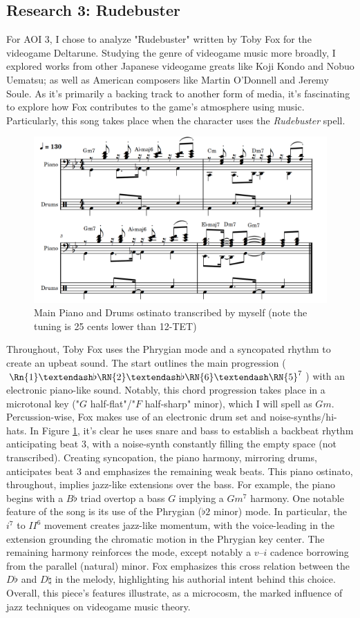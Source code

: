 \documentclass[12pt]{article}
\begin{document}
\subsection{Research 3: Rudebuster}

For AOI 3, I chose to analyze "Rudebuster"\autocite{rudebuster} written by Toby Fox for the videogame Deltarune. Studying the genre of videogame music more broadly, I explored works from other Japanese videogame greats like Koji Kondo and Nobuo Uematsu; as well as American composers like Martin O'Donnell and Jeremy Soule. As it's primarily a backing track to another form of media, it's fascinating to explore how Fox contributes to the game's atmosphere using music. Particularly, this song takes place when the character uses the \textit{Rudebuster} spell.
\begin{figure}[ht]
\centering
\includegraphics[width=0.85\linewidth]{rudebuster}
\caption{Main Piano and Drums ostinato transcribed by myself (note the tuning is 25 cents lower than 12-TET)}
\label{fig:rude}
\end{figure}

Throughout, Toby Fox uses the Phrygian mode and a syncopated rhythm to create an upbeat sound. The start outlines the main progression ($\Rn{1}–\flat\RN{2}–\flat\RN{6}–\RN{5}^7$) with an electronic piano-like sound. Notably, this chord progression takes place in a microtonal key ("$G$ half-flat"/"$F$ half-sharp" minor), which I will  spell as $Gm$. Percussion-wise, Fox makes use of an electronic drum set and noise-synths/hi-hats. In Figure \ref{fig:rude}, it's clear he uses snare and bass to establish a backbeat rhythm anticipating beat 3, with a noise-synth constantly filling the empty space (not transcribed). Creating syncopation, the piano harmony, mirroring drums, anticipates beat 3 and emphasizes the remaining weak beats. This piano ostinato, throughout, implies jazz-like extensions over the bass. For example, the piano begins with a $B\flat$ triad overtop a bass $G$ implying a $Gm^7$ harmony.
One notable feature of the song is its use of the Phrygian ($\flat 2$ minor) mode. In particular, the $i^{7}$ to $II^6$ movement creates jazz-like momentum, with the voice-leading in the extension grounding the chromatic motion in the Phrygian key center. The remaining harmony reinforces the mode, except notably a $v–i$ cadence borrowing from the parallel (natural) minor. Fox emphasizes this cross relation between the $D\flat$ and $D\natural$ in the melody, highlighting his authorial intent behind this choice. Overall, this piece's features illustrate, as a microcosm, the marked influence of jazz techniques on videogame music theory.
\end{document}
